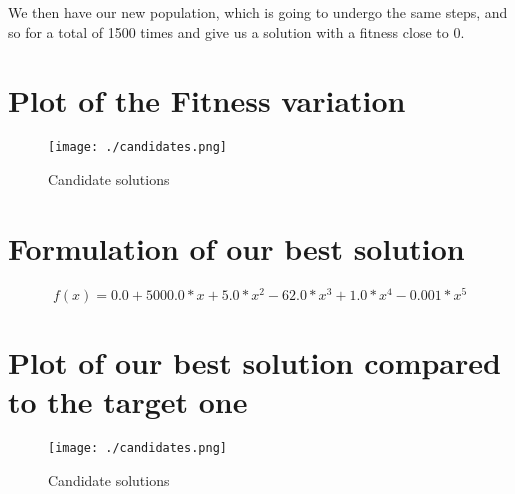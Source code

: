 \documentclass[12pt]{article}
\begin{document}
We then have our new population, which is going to undergo the same steps, and so for a total of 1500 times and give us a solution with a fitness close to 0.

\section{Plot of the Fitness variation}

\begin{figure}[H]
	\centering
	\texttt{[image: ./candidates.png]}
	\caption{Candidate solutions}
\end{figure}

\section{Formulation of our best solution}

$$f(x) = 0.0 + 5000.0*x + 5.0*x^2 - 62.0*x^3 + 1.0*x^4 - 0.001*x^5$$

\section{Plot of our best solution compared to the target one}

\begin{figure}[H]
	\centering
	\texttt{[image: ./candidates.png]}
	\caption{Candidate solutions}
\end{figure}
\end{document}
